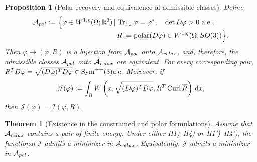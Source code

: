 \documentclass[10pt,a4paper]{amsart}
\newtheorem{theorem}{Theorem}
\newtheorem{proposition}{Proposition}
\begin{document}
\begin{proposition}[Polar recovery and equivalence of admissible classes]
\label{prop:polar-equivalence}
Define
\begin{align}
\mathcal A_{\rm pol}
:=
\Bigl\{
\varphi\in {\rm W}^{1,p}(\Omega;\mathbb R^3)\,|\,
&\operatorname{Tr}_{\Gamma_d}\varphi=\varphi^*,
\quad
\det{\rm D}\varphi>0\ \text{a.e.},
\notag\\[-1mm]
& R:=\operatorname{polar}({\rm D}\varphi)
\in  {\rm W}^{1,q}(\Omega;{\rm SO}(3)) 
\Bigr\}.
\end{align}
Then
$
\varphi\mapsto(\varphi,R)
$
is a bijection from $\mathcal A_{\rm pol}$ onto $\mathcal A_{\rm relax}$, and, therefore, the admissible classes $\mathcal A_{\rm pol}$ onto $\mathcal A_{\rm relax}$ are equivalent. For every corresponding pair,
$
R^T{\rm D}\varphi
=
\sqrt{({\rm D}\varphi)^T{\rm D}\varphi}
\in\operatorname{Sym}^{++}(3)
\text{a.e.}
$
Moreover, if
\begin{align}
\mathcal J(\varphi)
:=
\int_\Omega
W\left(x,
\sqrt{({\rm D}\varphi)^T{\rm D}\varphi},
R^T\operatorname{Curl}\overline R
\right)\,\mathrm dx,
\end{align}
then
$
\mathcal J(\varphi)=\mathcal I(\varphi,R).
$
\end{proposition}

\begin{theorem}[Existence in the constrained and polar formulations]
\label{thm:elastic3}
Assume that $\mathcal A_{\rm relax}$ contains a pair of finite energy. Under either H1)--H4) or H1')--H4'), the functional $\mathcal I$ admits a minimizer in $\mathcal A_{\rm relax}$. Equivalently, $\mathcal J$ admits a minimizer in $\mathcal A_{\rm pol}$.
\end{theorem}
\end{document}
